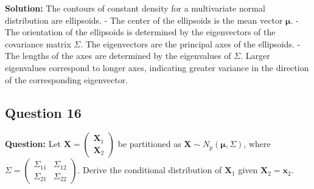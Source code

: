 \textbf{Solution:}
The contours of constant density for a multivariate normal distribution are ellipsoids.
- The center of the ellipsoids is the mean vector $\boldsymbol{\mu}$.
- The orientation of the ellipsoids is determined by the eigenvectors of the covariance matrix $\Sigma$. The eigenvectors are the principal axes of the ellipsoids.
- The lengths of the axes are determined by the eigenvalues of $\Sigma$. Larger eigenvalues correspond to longer axes, indicating greater variance in the direction of the corresponding eigenvector.

\subsection*{Question 16}
\textbf{Question:} Let $\mathbf{X} = \begin{pmatrix} \mathbf{X}_1 \\ \mathbf{X}_2 \end{pmatrix}$ be partitioned as $\mathbf{X} \sim N_p(\boldsymbol{\mu}, \Sigma)$, where $\Sigma = \begin{pmatrix} \Sigma_{11} & \Sigma_{12} \\ \Sigma_{21} & \Sigma_{22} \end{pmatrix}$. Derive the conditional distribution of $\mathbf{X}_1$ given $\mathbf{X}_2 = \mathbf{x}_2$.

